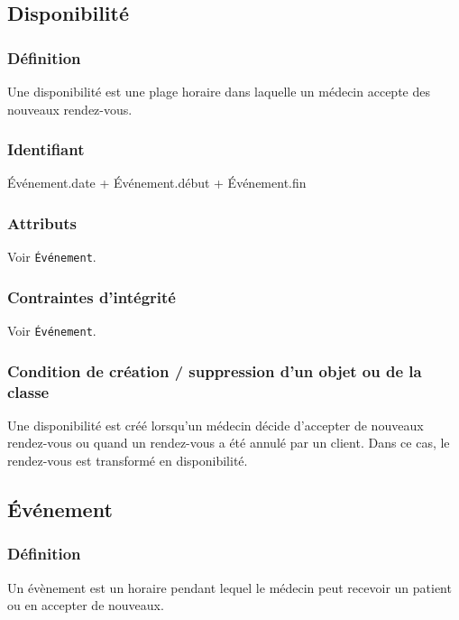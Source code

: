 \subsection{Disponibilité}

\subsubsection{Définition}

Une disponibilité est une plage horaire dans laquelle un médecin accepte
des nouveaux rendez-vous.

\subsubsection{Identifiant}

Événement.date + Événement.début + Événement.fin

\subsubsection{Attributs}

Voir \texttt{Événement}.

\subsubsection{Contraintes d'intégrité}

Voir \texttt{Événement}.

\subsubsection{Condition de création / suppression d'un objet ou de la classe}

Une disponibilité est créé lorsqu'un médecin décide d'accepter de nouveaux rendez-vous ou quand un
rendez-vous a été annulé par un client. Dans ce cas, le rendez-vous est transformé en disponibilité.

\subsection{Événement}

\subsubsection{Définition}

Un évènement est un horaire pendant lequel le médecin peut recevoir un patient ou en accepter de nouveaux.

